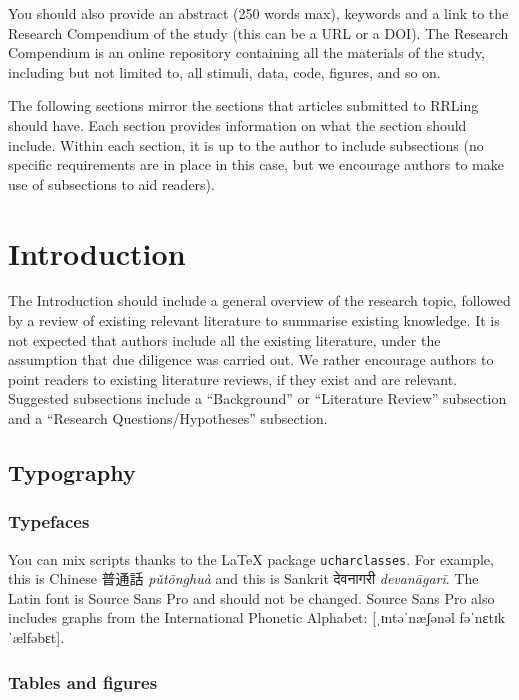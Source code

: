 \documentclass[
]{rrling}
\begin{document}
You should also provide an abstract (250 words max), keywords and a link
to the Research Compendium of the study (this can be a URL or a DOI).
The Research Compendium is an online repository containing all the
materials of the study, including but not limited to, all stimuli, data,
code, figures, and so on.

The following sections mirror the sections that articles submitted to
RRLing should have. Each section provides information on what the
section should include. Within each section, it is up to the author to
include subsections (no specific requirements are in place in this case,
but we encourage authors to make use of subsections to aid readers).

\section{Introduction}\label{introduction}

The Introduction should include a general overview of the research
topic, followed by a review of existing relevant literature to summarise
existing knowledge. It is not expected that authors include all the
existing literature, under the assumption that due diligence was carried
out. We rather encourage authors to point readers to existing literature
reviews, if they exist and are relevant. Suggested subsections include a
``Background'' or ``Literature Review'' subsection and a ``Research
Questions/Hypotheses'' subsection.

\subsection*{Typography}\label{typography}

\subsubsection*{Typefaces}\label{typefaces}

You can mix scripts thanks to the LaTeX package \texttt{ucharclasses}.
For example, this is Chinese 普通話 \emph{pǔtōnghuà} and this is Sankrit
देवनागरी \emph{devanāgarī}. The Latin font is Source Sans Pro and should
not be changed. Source Sans Pro also includes graphs from the
International Phonetic Alphabet: {[}ˌɪntəˈnæʃənəl fəˈnɛtɪk ˈælfəbɛt{]}.

\subsubsection*{Tables and figures}\label{tables-and-figures}
\end{document}
